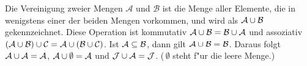 \documentclass{article}
\begin{document}
Die Vereinigung zweier Mengen $\mathcal{A}$ und
$\mathcal{B}$ ist die Menge aller Elemente, die in wenigstens einer der beiden
Mengen vorkommen, und wird als $\cal A\cup B$ gekennzeichnet. Diese
Operation ist kommutativ $\cal A\cup B = B\cup A$ und assoziativ
$\cal(A\cup B)\cup C = A\cup(B\cup C)$. Ist $\cal A\subseteq B$, dann gilt
$\cal A\cup B = B$. Daraus folgt $\cal A\cup A = A$,
$\cal A\cup\emptyset = A$ und $\cal J\cup A = J$. (\,$\emptyset$ steht
f"ur die leere Menge.)
\end{document}
